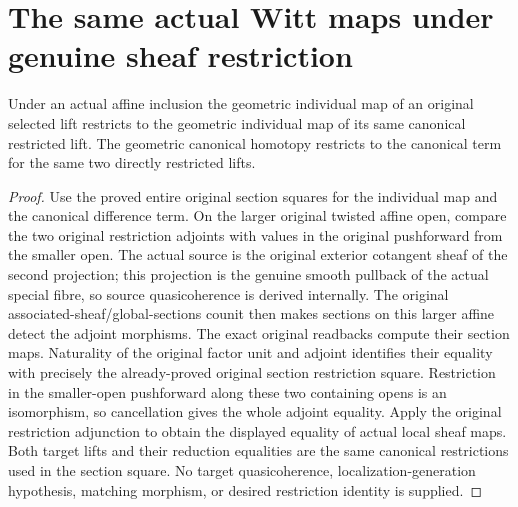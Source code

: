 \section{The same actual Witt maps under genuine sheaf restriction}

\begin{theorem}
\label{thm:actual-witt-geometric-xi-homotopy-restriction}
\leanok
Under an actual affine inclusion the geometric individual map of an original selected lift restricts to the geometric individual map of its same canonical restricted lift. The geometric canonical homotopy restricts to the canonical term for the same two directly restricted lifts.
\end{theorem}
\begin{proof}
Use the proved entire original section squares for the individual map and the canonical difference term. On the larger original twisted affine open, compare the two original restriction adjoints with values in the original pushforward from the smaller open. The actual source is the original exterior cotangent sheaf of the second projection; this projection is the genuine smooth pullback of the actual special fibre, so source quasicoherence is derived internally. The original associated-sheaf/global-sections counit then makes sections on this larger affine detect the adjoint morphisms. The exact original readbacks compute their section maps. Naturality of the original factor unit and adjoint identifies their equality with precisely the already-proved original section restriction square. Restriction in the smaller-open pushforward along these two containing opens is an isomorphism, so cancellation gives the whole adjoint equality. Apply the original restriction adjunction to obtain the displayed equality of actual local sheaf maps. Both target lifts and their reduction equalities are the same canonical restrictions used in the section square. No target quasicoherence, localization-generation hypothesis, matching morphism, or desired restriction identity is supplied.
\end{proof}

